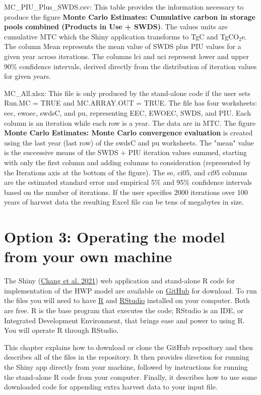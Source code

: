 \documentclass[
  openany]{book}
\begin{document}
MC\_PIU\_Plus\_SWDS.csv: This table provides the information necessary
to produce the figure \textbf{Monte Carlo Estimates: Cumulative carbon
in storage pools combined (Products in Use + SWDS)}. The values units
are cumulative MTC which the Shiny application transforms to TgC and
TgCO\(_2\)e. The column Mean represents the mean value of SWDS plus PIU
values for a given year across iterations. The columns lci and uci
represent lower and upper 90\% confidence intervals, derived directly
from the distribution of iteration values for given years.

MC\_All.xlsx: This file is only produced by the stand-alone code if the
user sets Run.MC = TRUE and MC.ARRAY.OUT = TRUE. The file has four
worksheets: eec, ewoec, swdsC, and pu, representing EEC, EWOEC, SWDS,
and PIU. Each column is an iteration while each row is a year. The data
are in MTC. The figure \textbf{Monte Carlo Estimates: Monte Carlo
convergence evaluation} is created using the last year (last row) of the
swdsC and pu worksheets. The "mean" value is the successive means of the
SWDS + PIU iteration values summed, starting with only the first column
and adding columns to consideration (represented by the Iterations axis
at the bottom of the figure). The se, ci05, and ci95 columns are the
estimated standard error and empirical 5\% and 95\% confidence intervals
based on the number of iterations. If the user specifies 2000 iterations
over 100 years of harvest data the resulting Excel file can be tens of
megabytes in size.

\hypertarget{dnld}{%
\chapter{Option 3: Operating the model from your own
machine}\label{dnld}}

The Shiny (\protect\hyperlink{ref-R-shiny}{Chang et al. 2021}) web
application and stand-alone R code for implementation of the HWP model
are available on \href{https://github.com/}{GitHub} for download. To run
the files you will need to have \href{https://www.r-project.org/}{R} and
\href{https://www.rstudio.com/products/rstudio/}{RStudio} installed on
your computer. Both are free. R is the base program that executes the
code; RStudio is an IDE, or Integrated Development Environment, that
brings ease and power to using R. You will operate R through RStudio.

This chapter explains how to download or clone the GitHub repository and
then describes all of the files in the repository. It then provides
direction for running the Shiny app directly from your machine, followed
by instructions for running the stand-alone R code from your computer.
Finally, it describes how to use some downloaded code for appending
extra harvest data to your input file.
\end{document}
